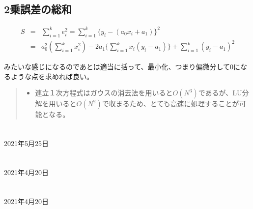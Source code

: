 \documentclass[dvipdfmx,uplatex]{jsarticle}
\begin{document}
\begin{spacing}{1.4}
\subsection{2乗誤差の総和}
\begin{eqnarray}
  S &=& \sum_{i=1}^{k}e_i^2 = \sum_{i=1}^{k} \{y_i - (a_0x_i + a_1)\}^2 \\
    &=& a_0^2(\sum_{i=1}^{k} x_i^2) - 2a_1\{\sum_{i=1}^{k} x_i(y_i - a_1)\} + \sum_{i=1}^{k}(y_i - a_1)^2
\end{eqnarray}

みたいな感じになるのであとは適当に括って、最小化、つまり偏微分して0になるような点を求めれば良い。\\

\begin{quote}
 \begin{itemize}
  \item 連立１次方程式はガウスの消去法を用いると$O(N^3)$であるが、LU分解を用いると$O(N^2)$で収まるため、とても高速に処理することが可能となる。
 \end{itemize}
\end{quote}
\newpage

\section{}
\begin{center}
  2021年5月25日 \\
\end{center}

\newpage

\section{}
\begin{center}
  2021年4月20日 \\
\end{center}

\newpage

\section{}
\begin{center}
  2021年4月20日 \\
\end{center}

\newpage

\section{}

\newpage

\section{}

\newpage

\end{spacing}
\end{document}
